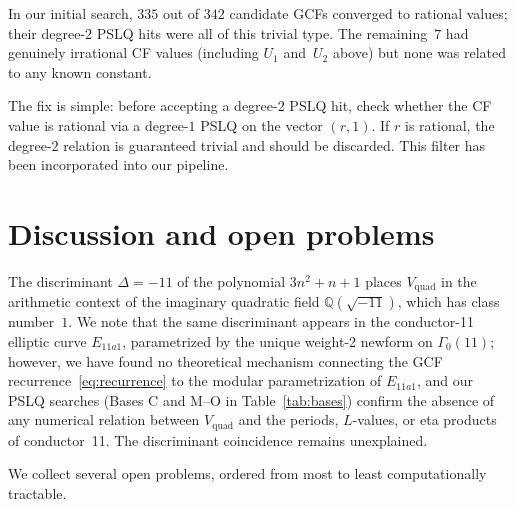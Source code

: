 \documentclass[11pt,a4paper]{article}
\theoremstyle{definition}
\theoremstyle{remark}
\newcommand{\Vq}{V_{\mathrm{quad}}}
\newcommand{\Q}{\mathbb{Q}}
\begin{document}
In our initial search, $335$ out of $342$ candidate GCFs converged to
rational values; their degree-$2$ PSLQ hits were all of this trivial
type. The remaining~$7$ had genuinely irrational CF values (including
$U_1$ and~$U_2$ above) but none was related to any known constant.

The fix is simple: before accepting a degree-$2$ PSLQ hit, check
whether the CF value is rational via a degree-$1$ PSLQ on the vector
$(r, 1)$. If $r$ is rational, the degree-$2$ relation is guaranteed
trivial and should be discarded. This filter has been incorporated
into our pipeline.


\section{Discussion and open problems}\label{sec:discussion}

The discriminant $\Delta = -11$ of the polynomial $3n^2 + n + 1$
places $\Vq$ in the arithmetic context of the imaginary quadratic
field $\Q(\sqrt{-11})$, which has class number~$1$.
We note that the same discriminant appears in the conductor-11
elliptic curve $E_{11a1}$, parametrized by the unique weight-2
newform on $\Gamma_0(11)$; however, we have found no theoretical
mechanism connecting the GCF recurrence~\eqref{eq:recurrence} to
the modular parametrization of $E_{11a1}$, and our PSLQ searches
(Bases C and M--O in Table~\ref{tab:bases}) confirm the absence of
any numerical relation between $\Vq$ and the periods, $L$-values,
or eta products of conductor~11.  The discriminant coincidence remains
unexplained.

We collect several open problems, ordered from most to least
computationally tractable.
\end{document}
